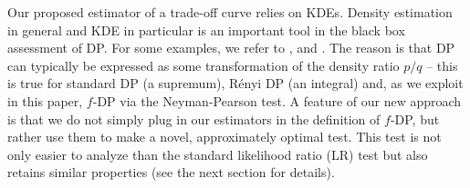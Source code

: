 Our proposed estimator of a trade-off curve relies on KDEs. Density estimation in general and KDE in particular is 
an important tool in the black box assessment of DP. For some examples, we refer to \cite{Liu2019}, \cite{Dette2022} and \cite{Kutta2024}. The reason is that DP can typically be expressed as some transformation of the density ratio $p/q$ -- this is true for standard DP (a supremum), Rényi DP (an integral) and, as we exploit in this paper, $f$-DP via the Neyman-Pearson test. A feature of our new approach is that we do not simply plug in our estimators in the definition of $f$-DP, but rather use them to make a novel, approximately optimal test. This test is not only easier to analyze than the standard likelihood ratio (LR) test but also retains similar properties (see the next section for details).
